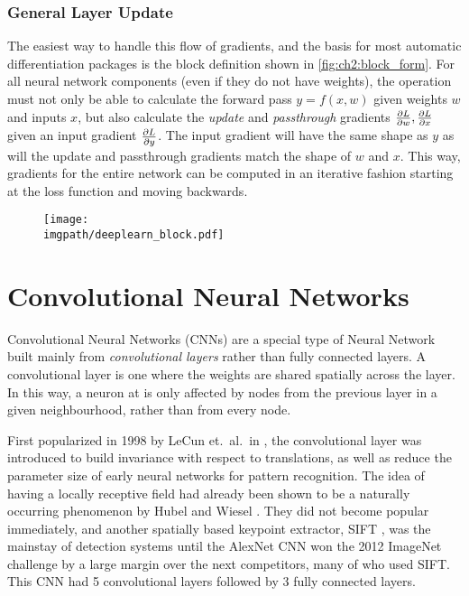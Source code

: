 \subsubsection{General Layer Update}
The easiest way to handle this flow of gradients, and the basis for most
automatic differentiation packages is the block definition shown in
\autoref{fig:ch2:block_form}. For all neural network components (even if they do
not have weights), the operation must not only be able to calculate the forward
pass $y=f(x, w)$ given weights $w$ and inputs $x$, but also calculate the
\emph{update} and \emph{passthrough} gradients $\frac{\partial L}{\partial w}, \frac{\partial L}{\partial x}$ given
an input gradient $\frac{\partial L}{\partial y}$. The input gradient will have the same shape as
$y$ as will the update and passthrough gradients match the shape of $w$ and $x$.
This way, gradients for the entire network can be computed in an iterative
fashion starting at the loss function and moving backwards.

\begin{figure}
  \centering
  \texttt{[image: \\imgpath/deeplearn\_block.pdf]}
  \label{fig:ch2:block_form}
\end{figure}

\section{Convolutional Neural Networks}\label{sec:ch2:cnns}
Convolutional Neural Networks (CNNs) are a special type of Neural Network built mainly from
\emph{convolutional layers} rather than fully connected layers. A convolutional
layer is one where the weights are shared spatially across the layer.
In this way, a neuron at is only affected by
nodes from the previous layer in a given neighbourhood, rather than from every node.

First popularized in 1998 by LeCun et.\ al.\ in \cite{lecun_gradient-based_1998},
the convolutional layer was introduced to build invariance with respect to
translations, as well as reduce the parameter size of early neural networks for
pattern recognition. The idea of having a locally receptive field had already
been shown to be a naturally occurring phenomenon by Hubel and Wiesel
\cite{hubel_receptive_1962}. They did not become popular immediately, and
another spatially based keypoint extractor, SIFT \cite{lowe_distinctive_2004},
was the mainstay of detection systems until the AlexNet CNN
\cite{krizhevsky_imagenet_2012} won the 2012 ImageNet challenge
\cite{russakovsky_imagenet_2015-1} by a large margin over the next competitors, many of
who used SIFT. This CNN had 5 convolutional layers followed by 3 fully
connected layers.

